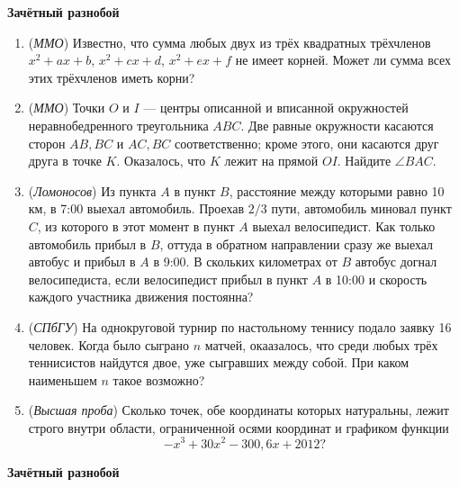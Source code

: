 


  \clearpage
  \pagestyle{empty}
  {\Large\bf Зачётный разнобой}
  \begin{enumerate}
    \item(\textit{ММО}) Известно, что сумма любых двух из трёх квадратных трёхчленов $x^2+ax+b$, $x^2+cx+d$, $x^2+ex+f$ не
    имеет корней. Может ли сумма всех этих трёхчленов иметь корни?
    \item(\textit{ММО})  Точки $O$ и $I$ --- центры описанной и вписанной окружностей неравнобедренного треугольника $ABC$. Две равные
    окружности касаются сторон $AB, BC$ и $AC, BC$ соответственно; кроме этого, они касаются друг друга в точке $K$. Оказалось, 
    что $K$ лежит на прямой $OI$. Найдите $\angle BAC$.
  \item(\textit{Ломоносов}) Из пункта $A$ в пункт $B$, расстояние между которыми равно 10 км, в 7:00 выехал автомобиль.
    Проехав $2/3$ пути, автомобиль миновал пункт $C$, из которого в этот момент в пункт
    $A$ выехал велосипедист. Как только автомобиль прибыл в $B$, оттуда в обратном направлении
    сразу же выехал автобус и прибыл в $A$ в 9:00. В скольких километрах от $B$ автобус догнал
    велосипедиста, если велосипедист прибыл в пункт $A$ в 10:00 и скорость каждого участника
    движения постоянна?
  \item(\textit{СПбГУ}) На однокруговой турнир по настольному теннису подало заявку 16 человек. Когда было
      сыграно $n$ матчей, окаазалось, что среди любых трёх теннисистов найдутся двое, уже сыгравших между
      собой. При каком наименьшем $n$ такое возможно?
    \item(\textit{Высшая проба}) Сколько точек, обе координаты которых натуральны, лежит строго внутри области,
      ограниченной осями координат и графиком функции \[-x^3+30x^2-300,6x+2012?\]
  \end{enumerate}
{\Large\bf Зачётный разнобой}
